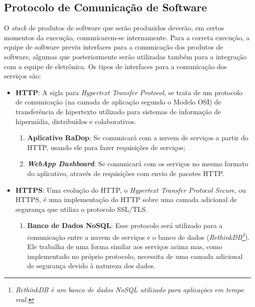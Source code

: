 \subsection{Protocolo de Comunicação de Software}

O \textit{stack} de produtos de software que serão produzidos deverão, em certos momentos da execução, comunicarem-se internamente. Para a correta execução, a equipe de software previu interfaces para a comunicação dos produtos de software, algumas que posteriormente serão utilizadas também para a integração com a equipe de eletrônica.
Os tipos de interfaces para a comunicação dos serviços são:
\begin{itemize}
    \item \textbf{HTTP}:
    A sigla para \textit{Hypertext Transfer Protocol}, se trata de um protocolo de comunicação (na camada de aplicação segundo o Modelo OSI) de transferência de hipertexto utilizado para sistemas de informação de hipermídia, distribuídos e colaborativos.
    \begin{enumerate}
        \item \textbf{Aplicativo RaDop}: Se comunicará com a nuvem de serviços a partir do HTTP, usando ele para fazer requisições de serviços;
        \item \textbf{\textit{WebApp Dashboard}}: Se comunicará com os serviços no mesmo formato do aplicativo, através de requisições com envio de pacotes HTTP.
    \end{enumerate}

    \item \textbf{HTTPS}:
    Uma evolução do HTTP, o \textit{Hypertext Transfer Protocol Secure}, ou HTTPS, é uma implementação do HTTP sobre uma camada adicional de segurança que utiliza o protocolo SSL/TLS.
    \begin{enumerate}
        \item \textbf{Banco de Dados NoSQL}: Esse protocolo será utilizado para a comunicação entre a nuvem de serviços e o banco de dados (\textit{RethinkDB\footnote{\textit{RethinkDB é um banco de dados \textit{NoSQL} utilizado para aplicações em tempo real.}}}). Ele trabalha de uma forma similar aos serviços acima mas, como implementado no próprio protocolo, necessita de uma camada adicional de segurança devido à natureza dos dados.
    \end{enumerate}


\end{itemize}
